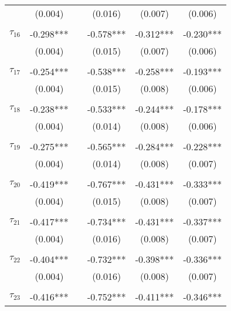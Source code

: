 \begin{tabular}{@{\extracolsep{-0pt}}lccccc}
                &  (0.004)  &&  (0.016)  &  (0.007)  &  (0.006)  \\
                &           &&           &           &           \\[-2.1ex]
$\tau_{16}$     & -0.298*** && -0.578*** & -0.312*** & -0.230*** \\
                &  (0.004)  &&  (0.015)  &  (0.007)  &  (0.006)  \\
                &           &&           &           &           \\[-2.1ex]
$\tau_{17}$     & -0.254*** && -0.538*** & -0.258*** & -0.193*** \\
                &  (0.004)  &&  (0.015)  &  (0.008)  &  (0.006)  \\
                &           &&           &           &           \\[-2.1ex]
$\tau_{18}$     & -0.238*** && -0.533*** & -0.244*** & -0.178*** \\
                &  (0.004)  &&  (0.014)  &  (0.008)  &  (0.006)  \\
                &           &&           &           &           \\[-2.1ex]
$\tau_{19}$     & -0.275*** && -0.565*** & -0.284*** & -0.228*** \\
                &  (0.004)  &&  (0.014)  &  (0.008)  &  (0.007)  \\
                &           &&           &           &           \\[-2.1ex]
$\tau_{20}$     & -0.419*** && -0.767*** & -0.431*** & -0.333*** \\
                &  (0.004)  &&  (0.015)  &  (0.008)  &  (0.007)  \\
                &           &&           &           &           \\[-2.1ex]
$\tau_{21}$     & -0.417*** && -0.734*** & -0.431*** & -0.337*** \\
                &  (0.004)  &&  (0.016)  &  (0.008)  &  (0.007)  \\
                &           &&           &           &           \\[-2.1ex]
$\tau_{22}$     & -0.404*** && -0.732*** & -0.398*** & -0.336*** \\
                &  (0.004)  &&  (0.016)  &  (0.008)  &  (0.007)  \\
                &           &&           &           &           \\[-2.1ex]
$\tau_{23}$     & -0.416*** && -0.752*** & -0.411*** & -0.346*** \\

\end{tabular}
